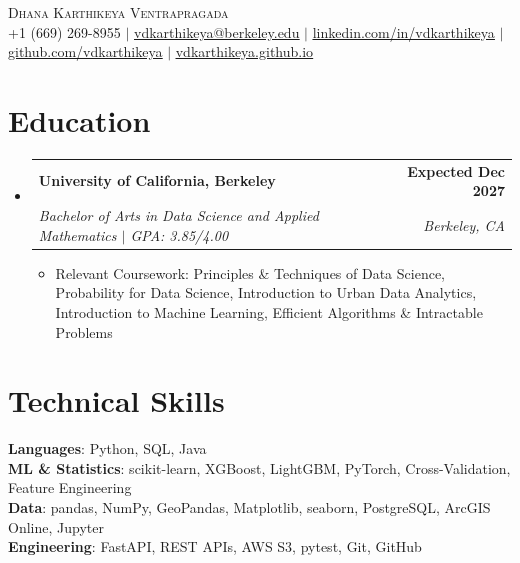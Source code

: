 \documentclass[letterpaper,11pt]{article}
\makeatletter
\newcommand{\resumeItem}[1]{%
  \item\small{{#1\vspace{-2pt}}}%
}
\newcommand{\resumeSubheading}[4]{
  \vspace{-2pt}\item
    \begin{tabular*}{1.0\textwidth}[t]{l@{\extracolsep{\fill}}r}
      \textbf{#1} & \textbf{\small #2} \\
      \textit{\small#3} & \textit{\small #4} \\
    \end{tabular*}\vspace{-7pt}
}
\newcommand{\resumeSubHeadingListStart}{\begin{itemize}[leftmargin=0.0in, label={}]}
\newcommand{\resumeSubHeadingListEnd}{\end{itemize}}
\newcommand{\resumeItemListStart}{\begin{itemize}[itemsep=2.5pt, topsep=3pt]}
\newcommand{\resumeItemListEnd}{\end{itemize}\vspace{-4pt}}
\makeatother
\begin{document}
\begin{center}
    {\Huge \scshape Dhana Karthikeya Ventrapragada} \\ \vspace{1pt}
        \footnotesize
    +1 (669) 269-8955 $|$
    \href{mailto:vdkarthikeya@berkeley.edu}{\uline{vdkarthikeya@berkeley.edu}} $|$
    \href{https://www.linkedin.com/in/vdkarthikeya/}{\uline{linkedin.com/in/vdkarthikeya}} $|$
    \href{https://github.com/vdkarthikeya}{\uline{github.com/vdkarthikeya}} $|$
    \href{https://vdkarthikeya.github.io}{\uline{vdkarthikeya.github.io}}
    \vspace{-8pt}
\end{center}

\section{Education}
\resumeSubHeadingListStart

\resumeSubheading
{University of California, Berkeley}{Expected Dec 2027}
{Bachelor of Arts in Data Science and Applied Mathematics \;$|$\; GPA: 3.85/4.00}{Berkeley, CA}

\vspace{-6pt}
\resumeItemListStart
\resumeItem{Relevant Coursework: Principles \& Techniques of Data Science, Probability for Data Science, Introduction to Urban Data Analytics, Introduction to Machine Learning, Efficient Algorithms \& Intractable Problems}
\resumeItemListEnd

\resumeSubHeadingListEnd
\vspace{-14pt}

\section{Technical Skills}
 \begin{itemize}[leftmargin=0.15in, label={}, itemsep=3pt]
    \small{\item{
     \textbf{Languages}{: Python, SQL, Java} \\[2pt]
     \textbf{ML \& Statistics}{: scikit-learn, XGBoost, LightGBM, PyTorch, Cross-Validation, Feature Engineering} \\[2pt]
     \textbf{Data}{: pandas, NumPy, GeoPandas, Matplotlib, seaborn, PostgreSQL, ArcGIS Online, Jupyter} \\[2pt]
     \textbf{Engineering}{: FastAPI, REST APIs, AWS S3, pytest, Git, GitHub}
    }}
 \end{itemize}
 \vspace{-15pt}
\end{document}
